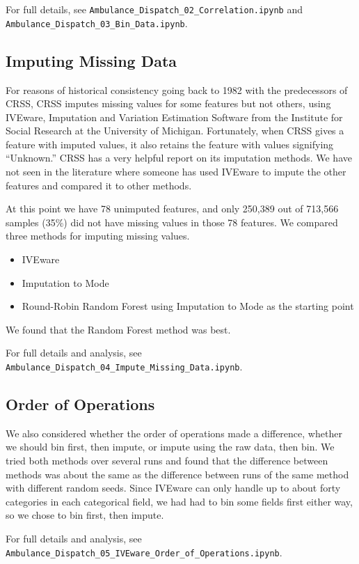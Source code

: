 For full details, see 
\verb|Ambulance_Dispatch_02_Correlation.ipynb| and 
\verb|Ambulance_Dispatch_03_Bin_Data.ipynb|.

\subsection{Imputing Missing Data}

For reasons of historical consistency going back to 1982 with the predecessors of CRSS, CRSS imputes missing values for some features but not others, using IVEware, Imputation and Variation Estimation Software from the Institute for Social Research at the University of Michigan.  Fortunately, when CRSS gives a feature with imputed values, it also retains the feature with values signifying ``Unknown.'' CRSS has a very helpful report on its imputation methods.  We have not seen in the literature where someone has used IVEware to impute the other features and compared it to other methods.  

At this point we have 78 unimputed features, and only 250,389 out of 713,566 samples (35\%) did not have missing values in those 78 features.  We compared three methods for imputing missing values.  

\begin{itemize}
	\item IVEware
	\item Imputation to Mode
	\item Round-Robin Random Forest using Imputation to Mode as the starting point
\end{itemize}

We found that the Random Forest method was best.  

For full details and analysis, see 
\verb|Ambulance_Dispatch_04_Impute_Missing_Data.ipynb|.

\subsection{Order of Operations}

We also considered whether the order of operations made a difference, whether we should bin first, then impute, or impute using the raw data, then bin.  We tried both methods over several runs and found that the difference between methods was about the same as the difference between runs of the same method with different random seeds.  Since IVEware can only handle up to about forty categories in each categorical field, we had had to bin some fields first either way, so we chose to bin first, then impute.  

For full details and analysis, see 
\verb|Ambulance_Dispatch_05_IVEware_Order_of_Operations.ipynb|.













